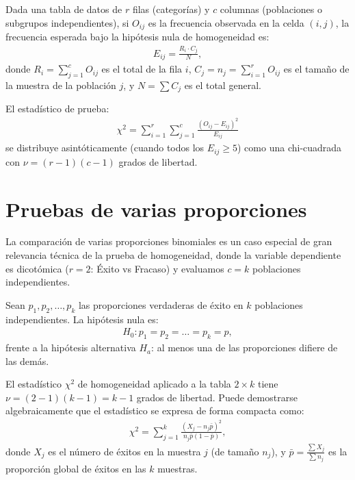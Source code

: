 \begin{teorema}
	Dada una tabla de datos de $r$ filas (categorías) y $c$ columnas (poblaciones o subgrupos independientes), si $O_{ij}$ es la frecuencia observada en la celda $(i,j)$, la frecuencia esperada bajo la hipótesis nula de homogeneidad es:
	\begin{align}
		E_{ij} = \frac{R_i \cdot C_j}{N},
	\end{align}
	donde $R_i = \sum_{j=1}^c O_{ij}$ es el total de la fila $i$, $C_j = n_j = \sum_{i=1}^r O_{ij}$ es el tamaño de la muestra de la población $j$, y $N = \sum C_j$ es el total general.

	El estadístico de prueba:
	\begin{align}
		\chi^2 = \sum_{i=1}^r \sum_{j=1}^c \frac{(O_{ij} - E_{ij})^2}{E_{ij}}
	\end{align}
	se distribuye asintóticamente (cuando todos los $E_{ij} \geq 5$) como una chi-cuadrada con $\nu = (r-1)(c-1)$ grados de libertad.
\end{teorema}

\section{Pruebas de varias proporciones}

La comparación de varias proporciones binomiales es un caso especial de gran relevancia técnica de la prueba de homogeneidad, donde la variable dependiente es dicotómica ($r=2$: Éxito vs Fracaso) y evaluamos $c = k$ poblaciones independientes.

\begin{definicion}
	Sean $p_1, p_2, \ldots, p_k$ las proporciones verdaderas de éxito en $k$ poblaciones independientes. La hipótesis nula es:
	\begin{align}
		H_0: p_1 = p_2 = \ldots = p_k = p,
	\end{align}
	frente a la hipótesis alternativa $H_a$: al menos una de las proporciones difiere de las demás.

	El estadístico $\chi^2$ de homogeneidad aplicado a la tabla $2 \times k$ tiene $\nu = (2-1)(k-1) = k-1$ grados de libertad. Puede demostrarse algebraicamente que el estadístico se expresa de forma compacta como:
	\begin{align}
		\chi^2 = \sum_{j=1}^k \frac{(X_j - n_j \bar{p})^2}{n_j \bar{p}(1-\bar{p})},
		\label{eq:chi2_k_prop}
	\end{align}
	donde $X_j$ es el número de éxitos en la muestra $j$ (de tamaño $n_j$), y $\bar{p} = \frac{\sum X_j}{\sum n_j}$ es la proporción global de éxitos en las $k$ muestras.
\end{definicion}

